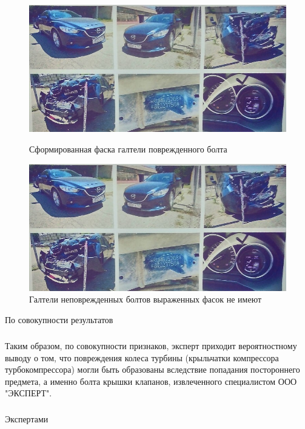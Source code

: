 \relax
\begin{figure}[h!]\centering
	\parbox[t]{0.49\textwidth}
	{\centering
		\includegraphics[width=.49\textwidth]{images/b3}
		\caption{\footnotesize {Сформированная фаска галтели поврежденного болта}}
		\label{ris:images/b3}}
	\hfil \hfil
	\parbox[t]{0.49\textwidth}
	{\centering
		\includegraphics[width=.49\textwidth]{images/b4}
		\caption{\footnotesize {Галтели неповрежденных болтов выраженных 
				фасок не имеют}}
		\label{ris:images/b4}}
\end{figure}

По совокупности результатов
\subparagraph*{}Таким образом, по совокупности признаков, эксперт приходит вероятностному  выводу о том, что повреждения колеса турбины (крыльчатки компрессора турбокомпрессора) могли быть образованы вследствие попадания постороннего предмета, а именно болта крышки клапанов, извлеченного специалистом ООО "ЭКСПЕРТ". 

\subparagraph*{}  Экспертами 


% 
% 
% 

